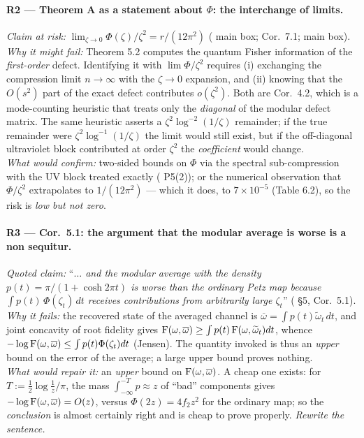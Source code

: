 \documentclass[11pt]{article}
\newcommand{\zz}{\zeta}
\begin{document}
\paragraph{R2 --- \NVII{} Theorem A as a statement about $\Phi$: the interchange of limits.}
\emph{Claim at risk:} $\lim_{\zz\to0}\Phi(\zz)/\zz^2=r/(12\pi^2)$ (\NVII{} main box; \NVII{} Cor.~7.1;
\NV{} main box).\\
\emph{Why it might fail:} Theorem 5.2 computes the quantum Fisher information of the \emph{first-order} defect.
Identifying it with $\lim\Phi/\zz^2$ requires (i) exchanging the compression limit $n\to\infty$ with the $\zz\to0$
expansion, and (ii) knowing that the $O(s^2)$ part of the exact defect contributes $o(\zz^2)$.  Both are \NV{}
Cor.~4.2, which is a mode-counting heuristic that treats only the \emph{diagonal} of the modular defect matrix.  The
same heuristic asserts a $\zz^2\log^{-2}(1/\zz)$ remainder; if the true remainder were $\zz^2\log^{-1}(1/\zz)$ the
limit would still exist, but if the off-diagonal ultraviolet block contributed at order $\zz^2$ the \emph{coefficient}
would change.\\
\emph{What would confirm:} two-sided bounds on $\Phi$ via the spectral sub-compression with the UV block treated
exactly (\NVI{} P5(2)); or the numerical observation that $\Phi/\zz^2$ extrapolates to $1/(12\pi^2)$ --- which it does,
to $7\times10^{-5}$ (Table 6.2), so the risk is \emph{low but not zero}.

\paragraph{R3 --- \NV{} Cor.~5.1: the argument that the modular average is worse is a non sequitur.}
\emph{Quoted claim:} ``\emph{$\dots$ and the modular average with the density $p(t)=\pi/(1+\cosh2\pi t)$ is worse than
the ordinary Petz map because $\int p(t)\,\Phi(\zz_t)\,dt$ receives contributions from arbitrarily large $\zz_t$}''
(\NV{} \S5, Cor.~5.1).\\
\emph{Why it fails:} the recovered state of the averaged channel is $\overline\omega=\int p(t)\widetilde\omega_t\,dt$,
and joint concavity of root fidelity gives
$\operatorname{F}(\omega,\overline\omega)\ge\int p(t)\operatorname{F}(\omega,\widetilde\omega_t)dt$, whence
$-\log\Fid(\omega,\overline\omega)\le\int p(t)\Phi(\zz_t)dt$ (Jensen).  The quantity invoked is thus an \emph{upper}
bound on the error of the average; a large upper bound proves nothing.\\
\emph{What would repair it:} an \emph{upper} bound on $\operatorname{F}(\omega,\overline\omega)$.  A cheap one exists: for
$T:=\frac12\log\frac1z/\pi$, the mass $\int_{-\infty}^{-T}p\approx z$ of ``bad'' components gives
$-\log\operatorname{F}(\omega,\overline\omega)=O(z)$, versus $\Phi(2z)=4f_2z^2$ for the ordinary map; so the \emph{conclusion} is
almost certainly right and is cheap to prove properly.  \emph{Rewrite the sentence.}
\end{document}
